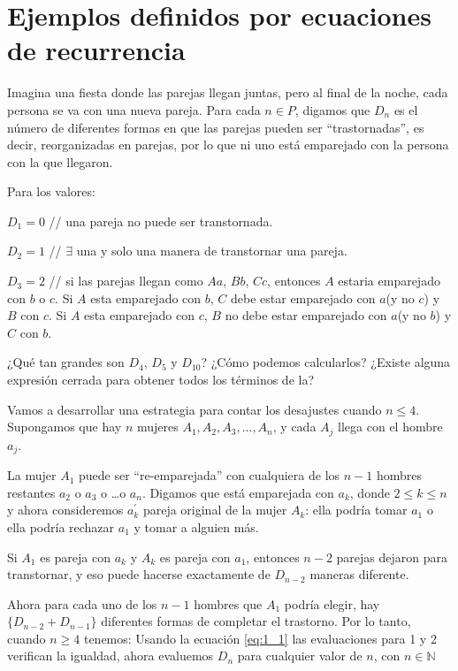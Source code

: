 \section{Ejemplos definidos por ecuaciones de recurrencia}
\begin{example}{}
	Imagina una fiesta donde las parejas llegan juntas, pero al final de la noche, cada persona se va con una nueva pareja. Para cada $n\in P$, digamos que $D_{n}$ es el número de diferentes formas en que las parejas pueden ser ``trastornadas'', es decir, reorganizadas en parejas, por lo que ni uno está emparejado con la persona con la que llegaron.
	
	Para los valores:
	
	$D_{1} = 0$  // una pareja no puede ser transtornada.
	
	$D_{2} = 1$  // $\exists$ una y solo una manera de transtornar una pareja.
	
	$D_{3} = 2$  // si las parejas llegan como $Aa$, $Bb$, $Cc$, entonces $A$ estaria emparejado con $b$ o $c$. Si $A$ esta emparejado con $b$, $C$ debe estar emparejado con $a$(y no $c$) y $B$ con $c$. Si $A$ esta emparejado con $c$, $B$ no debe estar emparejado con $a$(y no $b$) y $C$ con $b$.
	
	¿Qué tan grandes son $D_{4}$, $D_{5}$ y $D_{10}$? ¿Cómo podemos calcularlos? ¿Existe alguna expresión cerrada para obtener todos los términos de la? %
	
	Vamos a desarrollar una estrategia para contar los desajustes cuando $n\leq4$. Supongamos que hay $n$ mujeres $A_{1},A_{2},A_{3},\ldots,A_{n}$, y cada $A_{j}$ llega con el hombre $a_{j}$.
	
	La mujer $A_{1}$ puede ser ``re-emparejada'' con cualquiera de los $n-1$ hombres restantes $a_{2}$ o $a_{3}$ o \ldots o $a_{n}$. Digamos que está emparejada con $a_{k}$, donde $2\leq k\leq n$ y ahora consideremos $a_{k}^{\prime}$ pareja original de la mujer $A_{k}$: ella podría tomar $a_{1}$ o ella podría rechazar $a_{1}$ y tomar a alguien más.
	
	Si $A_{1}$ es pareja con $a_{k}$ y $A_{k}$ es pareja con $a_{1}$, entonces $n-2$ parejas dejaron para transtornar, y eso puede hacerse exactamente de $D_{n-2}$ maneras diferente.
	
	Ahora para cada uno de los $n-1$ hombres que $A_{1}$ podría elegir, hay $\{D_{n-2}+ D_{n-1}\}$ diferentes formas de completar el trastorno. Por lo tanto, cuando $n\geq 4$ tenemos:
Usando la ecuación \eqref{eq:1_1} las evaluaciones para 1 y 2 verifican la igualdad, ahora evaluemos $D_{n}$ para cualquier valor de $n$, con $n\in\mathds{N}$


\end{example}
